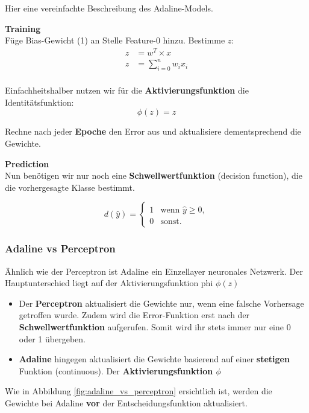 \newpage
Hier eine vereinfachte Beschreibung des Adaline-Models.

\textbf{Training} \\
Füge Bias-Gewicht (1) an Stelle Feature-0 hinzu.
Bestimme $z$:
\begin{align*}
	z &= w^{T} \times x \\
	z &= \sum_{i=0}^{n} w_{i}x_{i}  \\
\end{align*}


Einfachheitshalber nutzen wir für die \textbf{Aktivierungsfunktion} die Identitätsfunktion:
 $$\phi(z) = z$$
 
 Rechne nach jeder \textbf{Epoche} den Error aus und aktualisiere dementsprechend die Gewichte.



\textbf{Prediction} \\
Nun benötigen wir nur noch eine \textbf{Schwellwertfunktion} (decision function), die die vorhergesagte Klasse bestimmt.

$$ d(\hat{y}) =
\begin{cases}
	1 & \text{wenn } \hat{y} \geq 0, \\
	0 & \text{sonst.}
\end{cases}
$$


\newpage
\subsubsection{Adaline vs Perceptron}

Ähnlich wie der Perceptron ist Adaline ein Einzellayer neuronales Netzwerk. Der Hauptunterschied liegt auf der Aktivierungsfunktion phi $\phi(z)$


\begin{itemize}
  \item Der \textbf{Perceptron} aktualisiert die Gewichte nur, wenn eine falsche Vorhersage getroffen wurde. Zudem wird die Error-Funktion erst nach der \textbf{Schwellwertfunktion} aufgerufen. Somit wird ihr stets immer nur eine 0 oder 1 übergeben.
  \item \textbf{Adaline} hingegen aktualisiert die Gewichte basierend auf einer \textbf{stetigen} Funktion (continuous). Der \textbf{Aktivierungsfunktion $\phi$}
 \end{itemize}



Wie in Abbildung \ref{fig:adaline_vs_perceptron} ersichtlich ist, werden die Gewichte bei Adaline \textbf{vor} der Entscheidungsfunktion aktualisiert.

